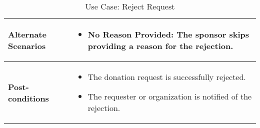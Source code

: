 \begin{table}[!ht]
\begin{tabularx}{\textwidth}{|l|X|}
        \hline
        \textbf{Alternate Scenarios} & 
        \begin{itemize}[label=--,itemsep=0pt]
            \item No Reason Provided: The sponsor skips providing a reason for the rejection.
        \end{itemize} \\
        \hline
        \textbf{Post-conditions} & 
        \begin{itemize}[label=--,itemsep=0pt]
            \item The donation request is successfully rejected.
            \item The requester or organization is notified of the rejection.
        \end{itemize} \\
        \hline
    \end{tabularx}
    \caption{Use Case: Reject Request}
    \label{tab:use-case-register}
\end{table}



